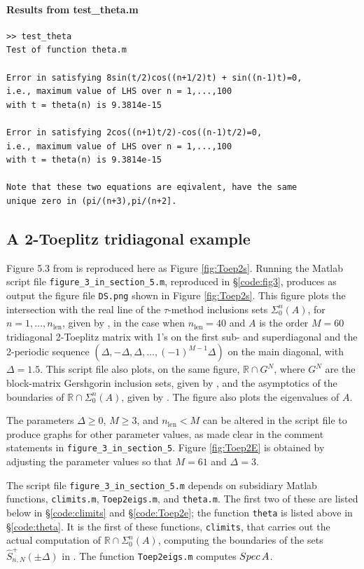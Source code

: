\documentclass[preprint,1p,11pt]{elsarticle}
\newcommand\R{{\mathbb R}}
\newcommand\Spec{{\rm Spec}\,}  %
\numberwithin{equation}{section}   %
\numberwithin{figure}{section}  %
\begin{document}
\paragraph{Results from test\_theta.m}
\begin{verbatim}
>> test_theta
Test of function theta.m
 
Error in satisfying 8sin(t/2)cos((n+1/2)t) + sin((n-1)t)=0,
i.e., maximum value of LHS over n = 1,...,100
with t = theta(n) is 9.3814e-15
 
Error in satisfying 2cos((n+1)t/2)-cos((n-1)t/2)=0,
i.e., maximum value of LHS over n = 1,...,100
with t = theta(n) is 9.3814e-15
 
Note that these two equations are eqivalent, have the same
unique zero in (pi/(n+3),pi/(n+2].
\end{verbatim}

\subsection{A 2-Toeplitz tridiagonal example} \label{sec:Toep2}

Figure 5.3 from \cite{CWL} is reproduced here as Figure \ref{fig:Toep2s}. Running the Matlab script file \verb+figure_3_in_section_5.m+, reproduced in \S\ref{code:fig3}, produces as output the figure file \verb+DS.png+ shown in Figure \ref{fig:Toep2s}. This figure plots the intersection with the real line of the $\tau$-method inclusions sets $\Sigma_0^n(A)$, for $n=1,\ldots,n_{\mathrm{len}}$, given by \cite[Equation (5.47)]{CWL}, in the case when $n_{\mathrm{len}}=40$ and $A$ is the order $M=60$ tridiagonal 2-Toeplitz matrix with 1's on the first sub- and superdiagonal and the 2-periodic sequence $(\Delta,-\Delta,\Delta,\ldots,(-1)^{M-1}\Delta)$ on the main diagonal, with $\Delta = 1.5$.  This script file also plots, on the same figure, $\R\cap G^N$, where $G^N$ are the block-matrix Gershgorin inclusion sets, given by \cite[Equation (5.50)]{CWL}, and the asymptotics of the boundaries of $\R\cap \Sigma_0^n(A)$, given by  \cite[Equation (5.48)]{CWL}. The figure also plots the eigenvalues of $A$. 

The parameters $\Delta\geq 0$, $M\geq 3$, and $n_{\mathrm{len}}<M$ can be altered in the script file to produce graphs for other parameter values, as made clear in the comment statements in \verb+figure_3_in_section_5+. Figure \ref{fig:Toep2E} is obtained by adjusting the parameter values so that $M=61$ and $\Delta=3$.

The script file  \verb+figure_3_in_section_5.m+ depends on subsidiary Matlab functions, \verb+climits.m+, \verb+Toep2eigs.m+, and \verb+theta.m+. The first two of these are listed below in \S\ref{code:climits} and  \S\ref{code:Toep2e}; the function \verb+theta+ is listed above in \S\ref{code:theta}. It is the first of these functions, \verb+climits+, that carries out the actual computation of $\R \cap \Sigma_0^n(A)$, computing the boundaries of the sets $\widehat S^+_{n,N}(\pm \Delta)$ in \cite[Equation (5.47)]{CWL}.  The function \verb+Toep2eigs.m+ computes $\Spec A$.
\end{document}
